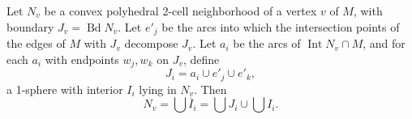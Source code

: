 Let $N_v$ be a convex polyhedral 2-cell neighborhood of a vertex $v$ of $M$, with boundary $J_v = \operatorname{Bd} N_v$. Let $e'_j$ be the arcs into which the intersection points of the edges of $M$ with $J_v$ decompose $J_v$. Let $a_i$ be the arcs of $\operatorname{Int} N_v \cap M$, and for each $a_i$ with endpoints $w_j, w_k$ on $J_v$, define
$$J_i = a_i \cup e'_j \cup e'_k,$$
a 1-sphere with interior $I_i$ lying in $N_v$. Then
$$N_v = \bigcup \overline{I}_i = \bigcup J_i \cup \bigcup I_i.$$
